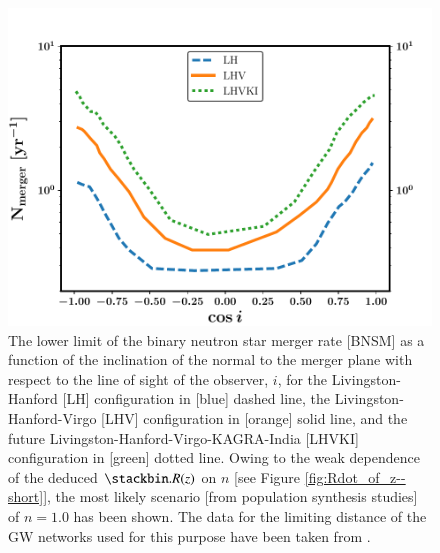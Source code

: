 \begin{figure}
\begin{center}
\includegraphics[scale=0.6]{BNSMr_lower_limits}
\caption[The lower limit of the binary neutron star merger rate for past, present, and future gravitational wave networks]{The lower limit of the binary neutron star merger rate [BNSM] as a function of the inclination of the normal to the merger plane with respect to the line of sight of the observer, $i$, for the Livingston-Hanford [LH] configuration in [blue] dashed line, the Livingston-Hanford-Virgo [LHV] configuration in [orange] solid line, and the future Livingston-Hanford-Virgo-KAGRA-India [LHVKI] configuration in [green] dotted line. Owing to the weak dependence of the deduced $ \Rcap(z) $ on $n$ [see Figure \ref{fig:Rdot_of_z--short}], the most likely scenario [from population synthesis studies] of $n = 1.0$ has been shown. The data for the limiting distance of the GW networks used for this purpose have been taken from \citealt{Saleem_et_al.-2018-MNRAS}.}
\label{fig:merger-rate}
\end{center}
\end{figure}






